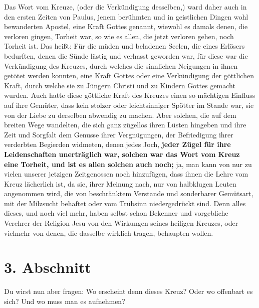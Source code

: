 Das Wort vom Kreuze, (oder die Verkündigung desselben,) ward daher auch in den
ersten Zeiten von Paulus, jenem berühmten und in geistlichen Dingen wohl
bewanderten Apostel, eine Kraft Gottes genannt, wiewohl es damals denen, die
verloren gingen, Torheit war, so wie es allen, die jetzt verloren gehen, noch
Torheit ist. Das heißt: Für die müden und beladenen Seelen, die eines Erlösers
bedurften, denen die Sünde lästig und verhasst geworden war, für diese war die
Verkündigung des Kreuzes, durch welches die sinnlichen Neigungen in ihnen
getötet werden konnten, eine Kraft Gottes oder eine Verkündigung der göttlichen
Kraft, durch welche sie zu Jüngern Christi und zu Kindern Gottes gemacht wurden.
Auch hatte diese göttliche Kraft des Kreuzes einen so mächtigen Einfluss auf
ihre
Gemüter, dass kein stolzer oder leichtsinniger Spötter im Stande war, sie von
der Liebe zu derselben abwendig zu machen. Aber solchen, die auf dem breiten Wege
wandelten, die sich ganz zügellos ihren Lüsten hingeben und ihre Zeit und
Sorgfalt dem Genusse ihrer Vergnügungen, der Befriedigung ihrer verderbten
Begierden widmeten, denen jedes Joch, \label{ref:03_02_leidenschaft}
\textbf{jeder Zügel für ihre Leidenschaften
unerträglich war, solchen war das Wort vom Kreuz eine Torheit, und ist es
allen solchen auch noch;} ja, man kann von nur zu vielen unserer jetzigen
Zeitgenossen noch hinzufügen, dass ihnen die Lehre vom Kreuz lächerlich ist, da
sie, ihrer Meinung nach, nur von halbklugen Leuten angenommen wird, die von
beschränktem Verstande und sonderbarer Gemütsart, mit der
Milzsucht behaftet
oder vom Trübsinn niedergedrückt sind. Denn alles dieses, und noch viel mehr,
haben selbst schon Bekenner und vorgebliche Verehrer der Religion Jesu von den
Wirkungen seines heiligen Kreuzes, oder vielmehr von denen, die dasselbe
wirklich tragen, behaupten wollen.

\section{3. Abschnitt} \label{kap3_ab3}

Du wirst nun aber fragen: Wo erscheint denn dieses Kreuz? Oder wo offenbart es
sich? Und wo muss man es aufnehmen?

\medskip

